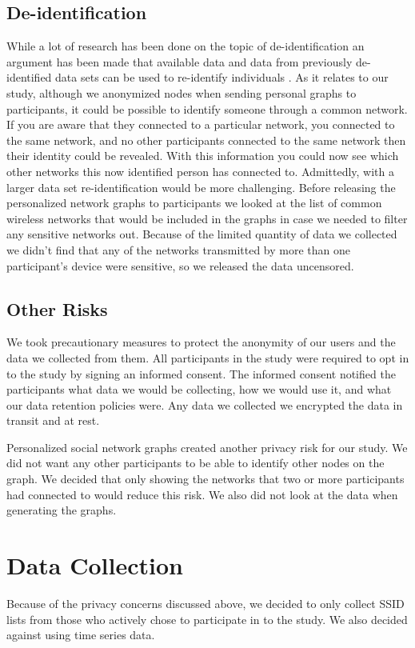 \documentclass[letterpaper,twocolumn,10pt]{article}
\begin{document}
\subsection{De-identification}
While a lot of research has been done on the topic of de-identification an argument 
has been made that available data and data from previously de-identified data sets 
can be used to re-identify individuals \cite{narayanan}.  As it relates to our study, 
although we anonymized nodes when sending personal graphs to participants, it could be possible
to identify someone through a common network.  If you are aware that they connected to a
particular network, you connected to the same network, and no other participants connected to
the same network then their identity could be revealed. With this information you could now see 
which other networks this now identified person has connected to. Admittedly, with a larger 
data set re-identification would be more challenging. Before releasing the personalized network graphs to participants we looked at the list of common wireless networks that would be included in the graphs in case we needed to filter any sensitive networks out. Because of the limited quantity of data we collected we didn't find that any of the networks transmitted by more than one participant's device were sensitive, so we released the data uncensored.


\subsection{Other Risks}
We took precautionary measures to protect the anonymity of our users and the data we collected from them. All participants in the study were required to opt in to the study by signing an informed consent. The informed consent notified the participants what data we would be collecting, how we would use it, and what our data retention policies were. Any data we collected we encrypted the data in transit and at rest. 

Personalized social network graphs created another privacy risk for our study. We did not want any other participants to be able to identify other nodes on the graph. We decided that only showing the networks that two or more participants had connected to would reduce this risk. We also did not look at the data when generating the graphs.



\section{Data Collection}
Because of the privacy concerns discussed above, we decided to only collect SSID lists from those who actively chose to participate in to the study. We also decided against using time series data.
\end{document}
